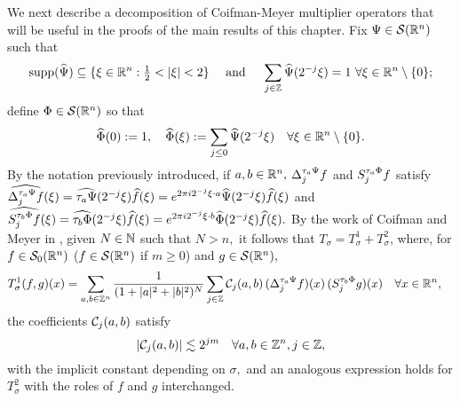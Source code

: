 %
We next describe a decomposition of Coifman-Meyer multiplier operators that will be useful in the proofs of the main results of this chapter. 
Fix $\Psi \in {\mathcal{S}}({{\mathbb R}^n})$ such that 
$$
{\rm{supp}}(\widehat{\Psi}) \subseteq \{ \xi \in {{\mathbb R}^n} : {\textstyle \frac{1}{2}} < |\xi| < 2 \} \quad\text{ and }\quad
\sum_{j\in\mathbb{Z}} \widehat{\Psi}(2^{-j}\xi) = 1 \,\,\forall \xi \in {{\mathbb R}^n} \setminus \{ 0 \};
$$
define $\Phi \in {\mathcal{S}}({{\mathbb R}^n})$ so that
$$
\widehat{\Phi}(0) := 1,\quad \widehat{\Phi}(\xi) := \sum_{j \le 0} \widehat{\Psi}(2^{-j}\xi)\quad \forall \xi \in {{\mathbb R}^n} \setminus \{0\}.$$
By the notation previously introduced, if $a,b\in{{\mathbb R}^n},$ $\Delta^{\tau_a \Psi }_{j} f$ and  $S^{ \tau_a \Phi }_{j} f$ satisfy $\widehat{\Delta^{\tau_a \Psi }_{j} f}(\xi)=\widehat{\tau_a\Psi}(2^{-j}\xi)\widehat{f}(\xi)=e^{2\pi i 2^{-j}\xi\cdot a} \widehat{\Psi}(2^{-j}\xi)\widehat{f}(\xi)$
 and   
 $\widehat{S^{\tau_b \Phi }_{j} f}(\xi)=\widehat{\tau_b\Phi}(2^{-j}\xi)\widehat{f}(\xi)=e^{2\pi i 2^{-j}\xi\cdot b} \widehat{\Phi}(2^{-j}\xi)\widehat{f}(\xi).$
By the work of Coifman and Meyer in \cite{MR518170},  given $N\in \mathbb{N}$ such that $N>n,$ it follows that $T_\sigma= T_\sigma^1 + T_\sigma^2$, where, for  $f\in {\mathcal{S}_0}({{\mathbb R}^n})$ ($f\in {\mathcal{S}}({{\mathbb R}^n})$ if $m\ge 0$) and $g\in{\mathcal{S}}({{\mathbb R}^n}),$
\begin{align}\label{eq:decompT1}
T_\sigma^1(f,g)(x) &= \sum_{a,b\in \mathbb{Z}^n} \frac{1}{(1+|a|^2+|b|^2)^N} \sum_{j\in\mathbb{Z}} \mathcal{C}_j(a,b) \,(\Delta^{ \tau_a \Psi }_{j} f)(x)\, (S^{ \tau_b \Phi }_{j} g )(x)\quad \forall x\in {{\mathbb R}^n},
\end{align}
 the coefficients $\mathcal{C}_j(a,b)$   satisfy
\begin{equation}\label{eq:cjbound}
\left\vert \mathcal{C}_j(a,b) \right\vert\lesssim 2^{jm}\quad \forall a,b\in\mathbb{Z}^n, j\in \mathbb{Z},
\end{equation}
with the implicit constant depending on $\sigma,$ and an analogous expression holds for $T_\sigma^2$ with the roles of $f$ and $g$ interchanged. 


